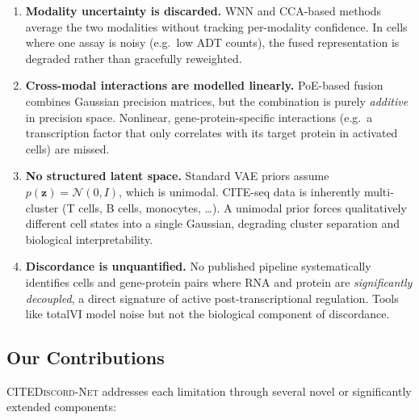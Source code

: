 \documentclass[11pt,a4paper]{article}
\newcommand{\citenet}{\textsc{CITEDiscord-Net}}
\newcommand{\bz}{\mathbf{z}}
\begin{document}
\begin{enumerate}[leftmargin=*,label=\textbf{L\arabic*.}]
  \item \textbf{Modality uncertainty is discarded.}
    WNN and CCA-based methods average the two modalities without tracking per-modality confidence.
    In cells where one assay is noisy (e.g.\ low ADT counts), the fused representation is degraded rather than gracefully reweighted.

  \item \textbf{Cross-modal interactions are modelled linearly.}
    PoE-based fusion~\citep{wu2018} combines Gaussian precision matrices, but the combination is purely \emph{additive} in precision space.
    Nonlinear, gene-protein-specific interactions (e.g.\ a transcription factor that only correlates with its target protein in activated cells) are missed.

  \item \textbf{No structured latent space.}
    Standard VAE priors assume $p(\bz)=\mathcal{N}(0,I)$, which is unimodal.
    CITE-seq data is inherently multi-cluster (T cells, B cells, monocytes, \ldots).
    A unimodal prior forces qualitatively different cell states into a single Gaussian, degrading cluster separation and biological interpretability.

  \item \textbf{Discordance is unquantified.}
    No published pipeline systematically identifies cells and gene-protein pairs where RNA and protein are \emph{significantly decoupled}, a direct signature of active post-transcriptional regulation.
    Tools like totalVI model noise but not the biological component of discordance.
\end{enumerate}

\subsection{Our Contributions}\label{ssec:contributions}

\citenet{} addresses each limitation through several novel or significantly extended components:
\end{document}
